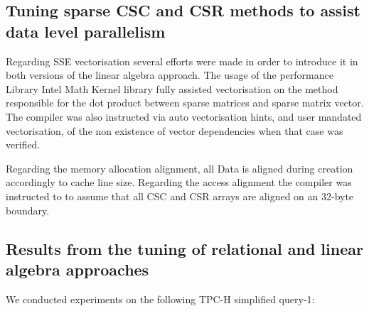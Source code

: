 \subsection{Tuning sparse CSC and CSR methods to assist data level parallelism}

Regarding SSE vectorisation several efforts were made in order to introduce it in both versions of the linear algebra approach. The usage of the performance Library Intel Math Kernel library fully assisted vectorisation on the method responsible for the dot product between sparse matrices and sparse matrix vector. The compiler was also instructed via auto vectorisation hints, and user mandated vectorisation, of the non existence of vector dependencies when that case was verified.\par 
Regarding the memory allocation alignment, all Data is aligned during creation accordingly to cache line size. Regarding the access alignment the compiler was instructed to to assume that all CSC and CSR arrays are aligned on an 32-byte boundary.

\subsection{Results from the tuning of  relational and linear algebra approaches}


We conducted experiments on the following TPC-H simplified query-1:



